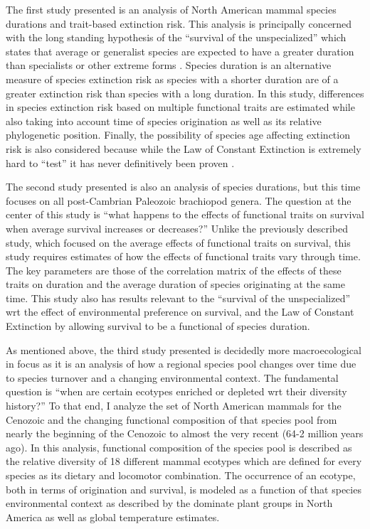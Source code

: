 The first study presented is an analysis of North American mammal species durations and trait-based extinction risk. This analysis is principally concerned with the long standing hypothesis of the ``survival of the unspecialized'' which states that average or generalist species are expected to have a greater duration than specialists or other extreme forms \citep{Simpson1944,Liow2004a,Liow2007b}. Species duration is an alternative measure of species extinction risk as species with a shorter duration are of a greater extinction risk than species with a long duration. In this study, differences in species extinction risk based on multiple functional traits are estimated while also taking into account time of species origination as well as its relative phylogenetic position. Finally, the possibility of species age affecting extinction risk is also considered because while the Law of Constant Extinction is extremely hard to ``test'' it has never definitively been proven \citep{VanValen1973,Liow2011a}.


The second study presented is also an analysis of species durations, but this time focuses on all post-Cambrian Paleozoic brachiopod genera. The question at the center of this study is ``what happens to the effects of functional traits on survival when average survival increases or decreases?'' Unlike the previously described study, which focused on the average effects of functional traits on survival, this study requires estimates of how the effects of functional traits vary through time. The key parameters are those of the correlation matrix of the effects of these traits on duration and the average duration of species originating at the same time. This study also has results relevant to the ``survival of the unspecialized'' wrt the effect of environmental preference on survival, and the Law of Constant Extinction by allowing survival to be a functional of species duration.

As mentioned above, the third study presented is decidedly more macroecological in focus as it is an analysis of how a regional species pool changes over time due to species turnover and a changing environmental context. The fundamental question is ``when are certain ecotypes enriched or depleted wrt their diversity history?'' To that end, I analyze the set of North American mammals for the Cenozoic and the changing functional composition of that species pool from nearly the beginning of the Cenozoic to almost the very recent (64-2 million years ago). In this analysis, functional composition of the species pool is described as the relative diversity of 18 different mammal ecotypes which are defined for every species as its dietary and locomotor combination. The occurrence of an ecotype, both in terms of origination and survival, is modeled as a function of that species environmental context as described by the dominate plant groups in North America as well as global temperature estimates.

